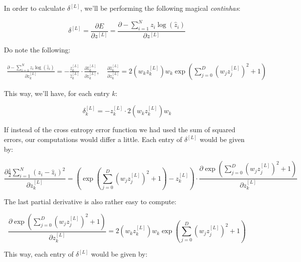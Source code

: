 \documentclass[12pt]{article}
\begin{document}
\begin{enumerate}
{              In order to calculate $\delta^{[L]}$, we'll be performing the
              following magical \textit{continhas}:

              $$
                \delta^{[L]} = \frac{\partial E}{\partial z^{[L]}}
                = \frac{\partial -\sum_{i=1}^N z_i \log(\hat{z}_i)}{\partial z^{[L]}}
              $$

              Do note the following:

              \begin{align*}
                \frac{\partial -\sum_{i=1}^N z_i \log(\hat{z}_i)}{\partial z_k^{[L]}}
                = - \frac{z_k^{[L]}}{\hat{z}_k^{[L]}} \cdot \frac{\partial \hat{z}_k^{[L]}}{\partial z_k^{[L]}}, \quad
                \frac{\partial \hat{z}_k^{[L]}}{\partial z_k^{[L]}} = 2 (w_k z_k^{[L]}) w_k \exp\left(\sum_{j=0}^D (w_j z_j^{[L]})^2 + 1\right)
              \end{align*}

              This way, we'll have, for each entry $k$:

              \begin{equation*}
                \delta_k^{[L]} = -z_k^{[L]} \cdot 2 (w_k z_k^{[L]}) w_k
              \end{equation*}

              If instead of the cross entropy error function we had used the
              sum of squared errors, our computations would differ a little.
              Each entry of $\delta^{[L]}$ would be given by:

              \begin{equation*}
                \frac{\partial \frac{1}{2} \sum_{i=1}^N (z_i - \hat{z}_i)^2}{\partial z_k^{[L]}}
                = \left(\exp\left(\sum_{j=0}^D (w_j z_j^{[L]})^2 + 1\right) - z_k^{[L]}\right) \cdot \frac{\partial \exp\left(\sum_{j=0}^D (w_j z_j^{[L]})^2 + 1\right)}{\partial z_k^{[L]}}
              \end{equation*}

              The last partial derivative is also rather easy to compute:

              \begin{equation*}
                \frac{\partial \exp\left(\sum_{j=0}^D (w_j z_j^{[L]})^2 + 1\right)}{\partial z_k^{[L]}}
                = 2 (w_k z_k^{[L]}) w_k \exp\left(\sum_{j=0}^D (w_j z_j^{[L]})^2 + 1\right)
              \end{equation*}

              This way, each entry of $\delta^{[L]}$ would be given by:

}
\end{enumerate}
\end{document}
